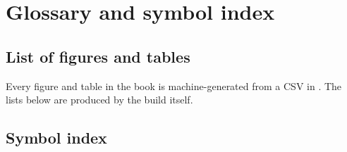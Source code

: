\section{Glossary and symbol index}
\label{ch:glossary}

\subsection{List of figures and tables}

Every figure and table in the book is machine-generated from a CSV in
. The lists below are produced by the build itself.

\listoffigures
\listoftables

\subsection{Symbol index}

